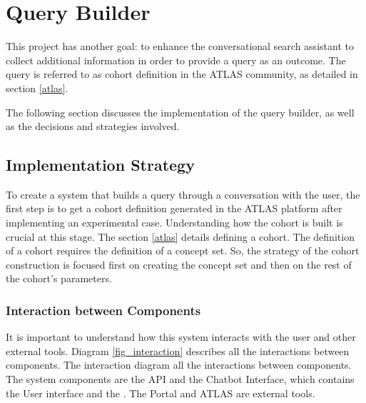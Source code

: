 \chapter{Query Builder}
\label{chapter:QB}

This project has another goal: to enhance the conversational search assistant to collect additional information in order to provide a query as an outcome. The query is referred to as cohort definition in the ATLAS community, as detailed in section \ref{atlas}.

The following section discusses the implementation of the query builder, as well as the decisions and strategies involved.


\section{Implementation Strategy}


To create a system that builds a query through a conversation with the user, the first step is to get a cohort definition generated in the ATLAS platform after implementing an experimental case. Understanding how the cohort is built is crucial at this stage. The section \ref{atlas} details defining a cohort. The definition of a cohort requires the definition of a concept set. So, the strategy of the cohort construction is focused first on creating the concept set and then on the rest of the cohort's parameters.


\subsection{Interaction between Components}

It is important to understand how this system interacts with the user and other external tools. Diagram \ref{fig_interaction} describes all the interactions between components. The interaction diagram all the interactions between components. The system components are the {\ir} API and the Chatbot Interface, which contains the User interface and the {\llm}. The {\ehden} Portal and ATLAS are external tools.

